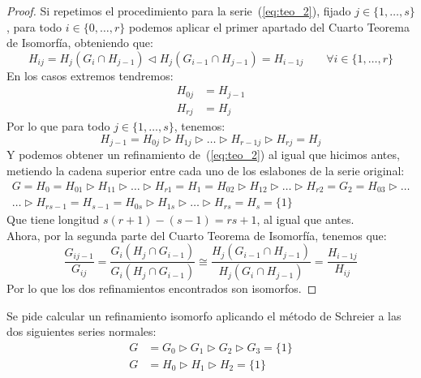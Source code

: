 \begin{teo}
\begin{proof}
        \noindent
        Si repetimos el procedimiento para la serie~(\ref{eq:teo_2}), fijado $j\in \{1,\ldots,s\}$, para todo $i \in \{0,\ldots, r\}$ podemos aplicar el primer apartado del Cuarto Teorema de Isomorfía, obteniendo que:
        \begin{equation*}
            H_{ij} = H_j(G_i\cap H_{j-1}) \lhd H_j(G_{i-1}\cap H_{j-1}) = H_{i-1j} \qquad \forall i \in \{1, \ldots, r\}
        \end{equation*}
        En los casos extremos tendremos:
        \begin{align*}
            H_{0j} &= H_{j-1} \\
            H_{rj} &= H_j
        \end{align*}
        Por lo que para todo $j \in \{1, \ldots, s\}$, tenemos:
        \begin{equation*}
            H_{j-1} = H_{0j} \rhd H_{1j} \rhd \ldots \rhd H_{r-1j} \rhd H_{rj} = H_j
        \end{equation*}
        Y podemos obtener un refinamiento de~(\ref{eq:teo_2}) al igual que hicimos antes, metiendo la cadena superior entre cada uno de los eslabones de la serie original:
        \begin{multline*}
            G = H_0 = H_{01} \rhd H_{11} \rhd \ldots \rhd H_{r1} = H_1 = H_{02} \rhd H_{12} \rhd \ldots \rhd H_{r2} = G_2 = H_{03} \rhd \ldots \\
            \ldots \rhd H_{rs-1} = H_{s-1} = H_{0s} \rhd H_{1s} \rhd \ldots \rhd H_{rs} = H_s = \{1\}
        \end{multline*}
        Que tiene longitud $s(r+1)-(s-1) = rs+1$, al igual que antes.\\

        \noindent
        Ahora, por la segunda parte del Cuarto Teorema de Isomorfía, tenemos que:
        \begin{equation*}
            \dfrac{G_{ij-1}}{G_{ij}} = \dfrac{G_i(H_j\cap G_{i-1})}{G_i(H_j\cap G_{i-1})} \cong \dfrac{H_j(G_{i-1}\cap H_{j-1})}{H_j(G_i \cap H_{j-1})} = \dfrac{H_{i-1j}}{H_{ij}}
        \end{equation*}
        Por lo que los dos refinamientos encontrados son isomorfos.
    \end{proof}
\end{teo}

\begin{ejercicio*}
    Se pide calcular un refinamiento isomorfo aplicando el método de Schreier a las dos siguientes series normales:
    \begin{align*}
        G &= G_0 \rhd G_1 \rhd G_2 \rhd G_3 = \{1\} \\
        G &= H_0 \rhd H_1 \rhd H_2 = \{1\}
    \end{align*}
\end{ejercicio*}

